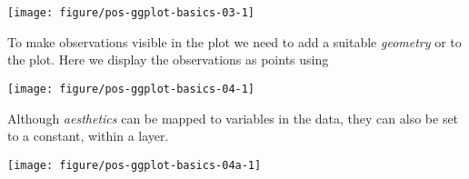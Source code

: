 \documentclass[krantz2]{krantz}\usepackage{knitr}%
\begin{document}
\begin{knitrout}\footnotesize
{}\color{fgcolor}\begin{kframe}
\begin{alltt}
\hlstd{(} 
       \hlstd{(}   
\end{alltt}
\end{kframe}

{\centering \texttt{[image: figure/pos-ggplot-basics-03-1]} 

}



\end{knitrout}

To make observations visible in the plot we need to add a suitable \emph{geometry} or  to the plot. Here we display the observations as points using 

\begin{knitrout}\footnotesize
{}\color{fgcolor}\begin{kframe}
\begin{alltt}
\hlstd{(} 
       \hlstd{(}    \hlopt{+}
  \hlstd{()}
\end{alltt}
\end{kframe}

{\centering \texttt{[image: figure/pos-ggplot-basics-04-1]} 

}



\end{knitrout}

Although \emph{aesthetics} can be mapped to variables in the data, they can also be set to a constant, within a layer.

\begin{knitrout}\footnotesize
{}\color{fgcolor}\begin{kframe}
\begin{alltt}
\hlstd{(} 
       \hlstd{(}    \hlopt{+}
  \hlstd{(} \hlstd{=} \hlstd{,}  \hlstd{=} \hlstd{)}
\end{alltt}
\end{kframe}

{\centering \texttt{[image: figure/pos-ggplot-basics-04a-1]} 

}



\end{knitrout}
\end{document}
